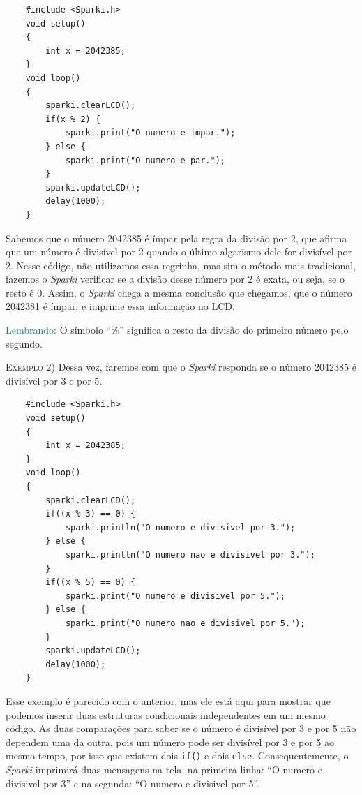     \begin{verbatim}
    #include <Sparki.h>
    void setup()
    {
        int x = 2042385;
    }
    void loop()
    {
        sparki.clearLCD();
        if(x % 2) {
            sparki.print("O numero e impar.");
        } else {
            sparki.print("O numero e par.");
        }
        sparki.updateLCD();
        delay(1000);
    }
    \end{verbatim}
    
    Sabemos que o número 2042385 é ímpar pela regra da divisão por 2, que afirma que um número é divisível por 2 quando o último algarismo dele for divisível por 2. Nesse código, não utilizamos essa regrinha, mas sim o método mais tradicional, fazemos o \textsl{Sparki} verificar se a divisão desse número por 2 é exata, ou seja, se o resto é 0. Assim, o \textsl{Sparki} chega a mesma conclusão que chegamos, que o número 2042381 é ímpar, e imprime essa informação no LCD.
    
    \begin{center}
    \textcolor{teal}{Lembrando:}
    O símbolo ``\%'' significa o resto da divisão do primeiro número pelo segundo.
    \end{center}
    
    \textsc{Exemplo 2)} Dessa vez, faremos com que o \textsl{Sparki} responda se o número 2042385 é divisível por 3 e por 5.
    
    \begin{verbatim}
    #include <Sparki.h>
    void setup()
    {
        int x = 2042385;
    }
    void loop()
    {
        sparki.clearLCD();
        if((x % 3) == 0) {
            sparki.println("O numero e divisivel por 3.");
        } else {
            sparki.println("O numero nao e divisivel por 3.");
        }
        if((x % 5) == 0) {
            sparki.print("O numero e divisivel por 5.");
        } else {
            sparki.print("O numero nao e divisivel por 5.");
        }
        sparki.updateLCD();
        delay(1000);
    }
    \end{verbatim}
    
    Esse exemplo é parecido com o anterior, mas ele está aqui para mostrar que podemos inserir duas estruturas condicionais independentes em um mesmo código. As duas comparações para saber se o número é divisível por 3 e por 5 não dependem uma da outra, pois um número pode ser divisível por 3 e por 5 ao mesmo tempo, por isso que existem dois \texttt{if()} e dois \texttt{else}. Consequentemente, o \textsl{Sparki} imprimirá duas mensagens na tela, na primeira linha: ``O numero e divisivel por 3'' e na segunda: ``O numero e divisivel por 5''.
    
